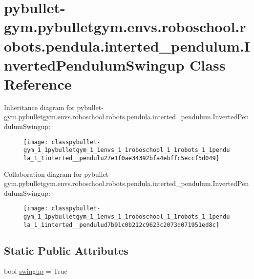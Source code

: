 \hypertarget{classpybullet-gym_1_1pybulletgym_1_1envs_1_1roboschool_1_1robots_1_1pendula_1_1interted__pendulum_1_1_inverted_pendulum_swingup}{}\section{pybullet-\/gym.pybulletgym.\+envs.\+roboschool.\+robots.\+pendula.\+interted\+\_\+pendulum.\+Inverted\+Pendulum\+Swingup Class Reference}
\label{classpybullet-gym_1_1pybulletgym_1_1envs_1_1roboschool_1_1robots_1_1pendula_1_1interted__pendulum_1_1_inverted_pendulum_swingup}


Inheritance diagram for pybullet-\/gym.pybulletgym.\+envs.\+roboschool.\+robots.\+pendula.\+interted\+\_\+pendulum.\+Inverted\+Pendulum\+Swingup\+:
\nopagebreak
\begin{figure}[H]
\begin{center}
\leavevmode
\texttt{[image: classpybullet-gym\_1\_1pybulletgym\_1\_1envs\_1\_1roboschool\_1\_1robots\_1\_1pendula\_1\_1interted\_\_pendulu27e1f0ae34392bfa4ebffc5eccf5d049]}
\end{center}
\end{figure}


Collaboration diagram for pybullet-\/gym.pybulletgym.\+envs.\+roboschool.\+robots.\+pendula.\+interted\+\_\+pendulum.\+Inverted\+Pendulum\+Swingup\+:
\nopagebreak
\begin{figure}[H]
\begin{center}
\leavevmode
\texttt{[image: classpybullet-gym\_1\_1pybulletgym\_1\_1envs\_1\_1roboschool\_1\_1robots\_1\_1pendula\_1\_1interted\_\_pendulud7b91c0b212c9623c2073d071951ed8c]}
\end{center}
\end{figure}
\subsection*{Static Public Attributes}
\begin{DoxyCompactItemize}
\item 
bool \hyperlink{classpybullet-gym_1_1pybulletgym_1_1envs_1_1roboschool_1_1robots_1_1pendula_1_1interted__pendulum_1_1_inverted_pendulum_swingup_a050551faec422c49791d1d600ba246d7}{swingup} = True
\end{DoxyCompactItemize}
